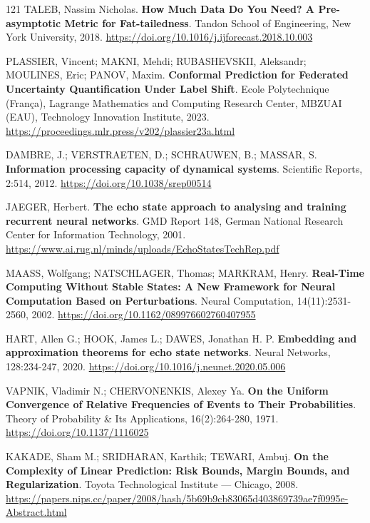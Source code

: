 \begin{thebibliography}{121}
  TALEB, Nassim Nicholas.
  \newblock \textbf{How Much Data Do You Need? A Pre-asymptotic Metric for Fat-tailedness}.
  \newblock Tandon School of Engineering, New York University, 2018.
  \newblock \url{https://doi.org/10.1016/j.ijforecast.2018.10.003}

  PLASSIER, Vincent; MAKNI, Mehdi; RUBASHEVSKII, Aleksandr; MOULINES, Eric; PANOV, Maxim.
  \newblock \textbf{Conformal Prediction for Federated Uncertainty Quantification Under Label Shift}.
  \newblock Ecole Polytechnique (França), Lagrange Mathematics and Computing Research Center, MBZUAI (EAU), Technology Innovation Institute, 2023.
  \newblock \url{https://proceedings.mlr.press/v202/plassier23a.html}

  DAMBRE, J.; VERSTRAETEN, D.; SCHRAUWEN, B.; MASSAR, S.
  \newblock \textbf{Information processing capacity of dynamical systems}.
  \newblock Scientific Reports, 2:514, 2012.
  \newblock \url{https://doi.org/10.1038/srep00514}

  JAEGER, Herbert.
  \newblock \textbf{The echo state approach to analysing and training recurrent neural networks}.
  \newblock GMD Report 148, German National Research Center for Information Technology, 2001.
  \newblock \url{https://www.ai.rug.nl/minds/uploads/EchoStatesTechRep.pdf}

  MAASS, Wolfgang; NATSCHLAGER, Thomas; MARKRAM, Henry.
  \newblock \textbf{Real-Time Computing Without Stable States: A New Framework for Neural Computation Based on Perturbations}.
  \newblock Neural Computation, 14(11):2531-2560, 2002.
  \newblock \url{https://doi.org/10.1162/089976602760407955}

  HART, Allen G.; HOOK, James L.; DAWES, Jonathan H. P.
  \newblock \textbf{Embedding and approximation theorems for echo state networks}.
  \newblock Neural Networks, 128:234-247, 2020.
  \newblock \url{https://doi.org/10.1016/j.neunet.2020.05.006}

  VAPNIK, Vladimir N.; CHERVONENKIS, Alexey Ya.
  \newblock \textbf{On the Uniform Convergence of Relative Frequencies of Events to Their Probabilities}.
  \newblock Theory of Probability \& Its Applications, 16(2):264-280, 1971.
  \newblock \url{https://doi.org/10.1137/1116025}

  KAKADE, Sham M.; SRIDHARAN, Karthik; TEWARI, Ambuj.
  \newblock \textbf{On the Complexity of Linear Prediction: Risk Bounds, Margin Bounds, and Regularization}.
  \newblock Toyota Technological Institute — Chicago, 2008.
  \newblock \url{https://papers.nips.cc/paper/2008/hash/5b69b9cb83065d403869739ae7f0995e-Abstract.html}


\end{thebibliography}
